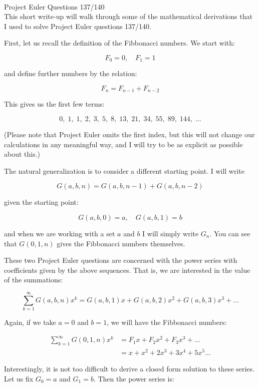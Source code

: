 \documentclass[12pt]{article}
\begin{document}
\\
Project Euler Questions 137/140\\

This short write-up will walk through some of the mathematical derivations that I used to solve Project Euler questions 137/140.

First, let us recall the definition of the Fibbonacci numbers. We start with:

$$
F_0=0,\quad F_1= 1
$$

and define further numbers by the relation:

$$
F_n=F_{n-1} + F_{n-2}
$$

This gives us the first few terms:

$$
0,\;1,\;1,\;2,\;3,\;5,\;8,\;13,\;21,\;34,\;55,\;89,\;144,\; \ldots
$$

(Please note that Project Euler omits the first index, but this will not change our calculations in any meaningful way, and I will try to be as explicit as possible about this.)

The natural generalization is to consider a different starting point. I will write 

$$
G(a, b, n) = G(a, b, n-1) + G(a, b, n-2)
$$

given the starting point:

$$
G(a, b, 0) = a,\quad G(a, b, 1) = b
$$

and when we are working with a set $a$ and $b$ I will simply write $G_n$. You can see that $G(0, 1 , n)$ gives the Fibbonacci numbers themselves.

\newpage

These two Project Euler questions are concerned with the power series with coefficients given by the above sequences. That is, we are interested in the value of the summations:

$$
\sum_{k=1}^\infty G(a, b, n) x^k = G(a, b, 1)x + G(a, b, 2)x^2 + G(a, b, 3)x^3 + \dots
$$

Again, if we take $a=0$ and $b=1$, we will have the Fibbonacci numbers:

\begin{align*}
\sum_{k=1}^\infty G(0, 1, n) x^k &= F_1x + F_2x^2 + F_3x^3 + \dots \\
					  & = x + x^2 + 2x^3 + 3x^4 +5x^5 \dots
\end{align*}

Interestingly, it is not too difficult to derive a closed form solution to these series. Let us fix $G_0 = a$ and $G_1 = b$. Then the power series is:
\end{document}

